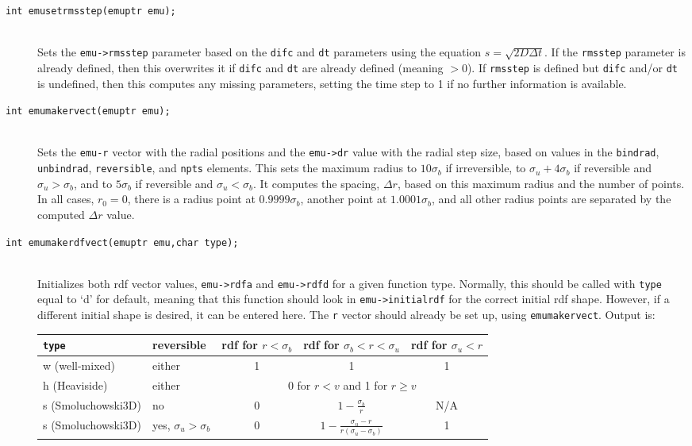 \documentclass {book}
\begin{document}
\begin{description}

\item[\texttt{int emusetrmsstep(emuptr emu);}]
\hfill \\
Sets the \texttt{emu->rmsstep} parameter based on the \texttt{difc} and \texttt{dt} parameters using the equation $s=\sqrt{2 D \Delta t}$. If the \texttt{rmsstep} parameter is already defined, then this overwrites it if \texttt{difc} and \texttt{dt} are already defined (meaning $>0$). If \texttt{rmsstep} is defined but \texttt{difc} and/or \texttt{dt} is undefined, then this computes any missing parameters, setting the time step to 1 if no further information is available.

\item[\texttt{int emumakervect(emuptr emu);}]
\hfill \\
Sets the \texttt{emu-r} vector with the radial positions and the \texttt{emu->dr} value with the radial step size, based on values in the \texttt{bindrad}, \texttt{unbindrad}, \texttt{reversible}, and \texttt{npts} elements. This sets the maximum radius to $10\sigma_b$ if irreversible, to $\sigma_u+4\sigma_b$ if reversible and $\sigma_u>\sigma_b$, and to $5\sigma_b$ if reversible and $\sigma_u<\sigma_b$. It computes the spacing, $\Delta r$, based on this maximum radius and the number of points. In all cases, $r_0=0$, there is a radius point at $0.9999\sigma_b$, another point at $1.0001\sigma_b$, and all other radius points are separated by the computed $\Delta r$ value.

\item[\texttt{int emumakerdfvect(emuptr emu,char type);}]
\hfill \\
Initializes both rdf vector values, \texttt{emu->rdfa} and \texttt{emu->rdfd} for a given function type. Normally, this should be called with \texttt{type} equal to `d' for default, meaning that this function should look in \texttt{emu->initialrdf} for the correct initial rdf shape. However, if a different initial shape is desired, it can be entered here. The \texttt{r} vector should already be set up, using \texttt{emumakervect}. Output is:

\begin{longtable}[c]{llccc}
\texttt{type} & reversible & rdf for $r<\sigma_b$ & rdf for $\sigma_b<r<\sigma_u$ & rdf for $\sigma_u<r$\\
\hline
w (well-mixed) & either & 1 & 1 & 1\\
h (Heaviside) & either & \multicolumn{3}{c}{0 for $r<v$ and 1 for $r \geq v$}\\
s (Smoluchowski3D) & no & 0 & $1-\frac{\sigma_b}{r}$ & N/A\\
s (Smoluchowski3D)  & yes, $\sigma_u > \sigma_b$ & 0 & $1-\frac{\sigma_u-r}{r(\sigma_u - \sigma_b)}$ & 1
\end{longtable}

\end{description}
\end{document}
